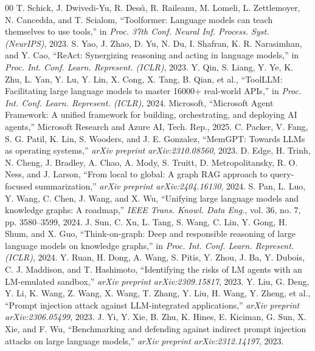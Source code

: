 \documentclass[conference,a4paper]{IEEEtran}
\begin{document}
\begin{thebibliography}{00}
 T. Schick, J. Dwivedi-Yu, R. Dess{\`\i}, R. Raileanu, M. Lomeli, L. Zettlemoyer, N. Cancedda, and T. Scialom, ``Toolformer: Language models can teach themselves to use tools,'' in \textit{Proc. 37th Conf. Neural Inf. Process. Syst. (NeurIPS)}, 2023.
 S. Yao, J. Zhao, D. Yu, N. Du, I. Shafran, K. R. Narasimhan, and Y. Cao, ``ReAct: Synergizing reasoning and acting in language models,'' in \textit{Proc. Int. Conf. Learn. Represent. (ICLR)}, 2023.
 Y. Qin, S. Liang, Y. Ye, K. Zhu, L. Yan, Y. Lu, Y. Lin, X. Cong, X. Tang, B. Qian, et al., ``ToolLLM: Facilitating large language models to master 16000+ real-world APIs,'' in \textit{Proc. Int. Conf. Learn. Represent. (ICLR)}, 2024.
 Microsoft, ``Microsoft Agent Framework: A unified framework for building, orchestrating, and deploying AI agents,'' Microsoft Research and Azure AI, Tech. Rep., 2025.
 C. Packer, V. Fang, S. G. Patil, K. Lin, S. Wooders, and J. E. Gonzalez, ``MemGPT: Towards LLMs as operating systems,'' \textit{arXiv preprint arXiv:2310.08560}, 2023.
 D. Edge, H. Trinh, N. Cheng, J. Bradley, A. Chao, A. Mody, S. Truitt, D. Metropolitansky, R. O. Ness, and J. Larson, ``From local to global: A graph RAG approach to query-focused summarization,'' \textit{arXiv preprint arXiv:2404.16130}, 2024.
 S. Pan, L. Luo, Y. Wang, C. Chen, J. Wang, and X. Wu, ``Unifying large language models and knowledge graphs: A roadmap,'' \textit{IEEE Trans. Knowl. Data Eng.}, vol. 36, no. 7, pp. 3580--3599, 2024.
 J. Sun, C. Xu, L. Tang, S. Wang, C. Lin, Y. Gong, H. Shum, and X. Guo, ``Think-on-graph: Deep and responsible reasoning of large language models on knowledge graphs,'' in \textit{Proc. Int. Conf. Learn. Represent. (ICLR)}, 2024.
 Y. Ruan, H. Dong, A. Wang, S. Pitis, Y. Zhou, J. Ba, Y. Dubois, C. J. Maddison, and T. Hashimoto, ``Identifying the risks of LM agents with an LM-emulated sandbox,'' \textit{arXiv preprint arXiv:2309.15817}, 2023.
 Y. Liu, G. Deng, Y. Li, K. Wang, Z. Wang, X. Wang, T. Zhang, Y. Liu, H. Wang, Y. Zheng, et al., ``Prompt injection attack against LLM-integrated applications,'' \textit{arXiv preprint arXiv:2306.05499}, 2023.
 J. Yi, Y. Xie, B. Zhu, K. Hines, E. Kiciman, G. Sun, X. Xie, and F. Wu, ``Benchmarking and defending against indirect prompt injection attacks on large language models,'' \textit{arXiv preprint arXiv:2312.14197}, 2023.

\end{thebibliography}
\end{document}
